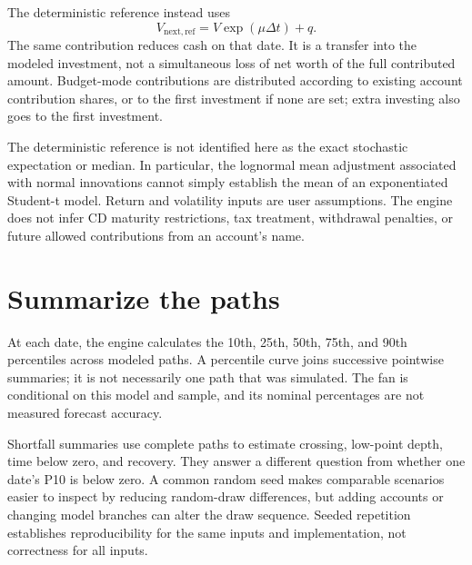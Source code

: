 The deterministic reference instead uses
\[
 V_{\mathrm{next,ref}}=V\exp(\mu\Delta t)+q.
\]
The same contribution reduces cash on that date. It is a transfer into the modeled investment, not a simultaneous loss of net worth of the full contributed amount. Budget-mode contributions are distributed according to existing account contribution shares, or to the first investment if none are set; extra investing also goes to the first investment.

The deterministic reference is not identified here as the exact stochastic expectation or median. In particular, the lognormal mean adjustment associated with normal innovations cannot simply establish the mean of an exponentiated Student-t model. Return and volatility inputs are user assumptions. The engine does not infer CD maturity restrictions, tax treatment, withdrawal penalties, or future allowed contributions from an account's name.

\section{Summarize the paths}
At each date, the engine calculates the 10th, 25th, 50th, 75th, and 90th percentiles across modeled paths. A percentile curve joins successive pointwise summaries; it is not necessarily one path that was simulated. The fan is conditional on this model and sample, and its nominal percentages are not measured forecast accuracy.

Shortfall summaries use complete paths to estimate crossing, low-point depth, time below zero, and recovery. They answer a different question from whether one date's P10 is below zero. A common random seed makes comparable scenarios easier to inspect by reducing random-draw differences, but adding accounts or changing model branches can alter the draw sequence. Seeded repetition establishes reproducibility for the same inputs and implementation, not correctness for all inputs.


